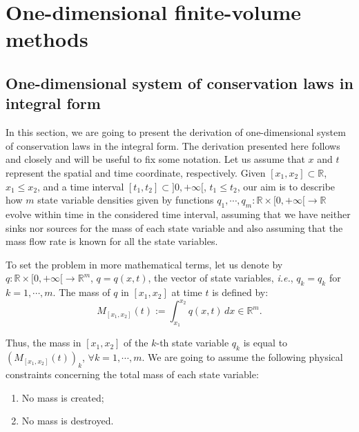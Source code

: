 
\chapter{One-dimensional finite-volume methods}
\label{chp1-1d-fv}
\section{One-dimensional system of conservation laws in integral form}
\label{chp1-sec1}
In this section, we are going to present the derivation of one-dimensional 
system of conservation laws in the integral form. 
The derivation presented here follows \citet{leveque:1990} and \citet{leveque:2002} closely and will
be useful to fix some notation. 
Let us assume that $x$ and $t$ represent the spatial and time coordinate, respectively.
Given $[x_1, x_2] \subset \mathbb{R}$, $x_1 \leq x_2$, and a time 
interval $[t_1, t_2] \subset ]0, +\infty[$, $t_1 \leq t_2$, 
our aim is to describe how $m$ state variable densities given by functions 
$q_1, \cdots, q_m: \mathbb{R}\times[0, +\infty[ \to \mathbb{R}$ 
evolve within time in the considered time interval, assuming that we have neither sinks nor sources 
for the mass of each state variable and also assuming that the mass
flow rate is known for all the state variables.

To set the problem in more mathematical terms, let us denote by 
${q}: \mathbb{R}\times [0, +\infty[\to \mathbb{R}^m$, 
${q} = {q}(x,t)$, the vector of state variables,
\textit{i.e.}, ${q}_k = q_k$ for $k=1, \cdots, m$.
The mass of ${q}$ in $[x_1, x_2]$ at time $t$ is defined by:
\begin{equation}
	\label{chp1-sec1-eq1}
	{M}_{[x_1, x_2]}(t) := \int_{x_1}^{x_2} {q}(x,t) \,dx \in \mathbb{R}^m.
\end{equation}

Thus, the mass in $[x_1, x_2]$ of the $k$-th state variable $q_k$ is equal to
$({M}_{[x_1, x_2]}(t))_k$, $\forall k = 1, \cdots, m$.
We are going to assume the following physical constraints concerning the total mass of each state variable:
\begin{enumerate}
	\item No mass is created;
	\item No mass is destroyed.
\end{enumerate}

